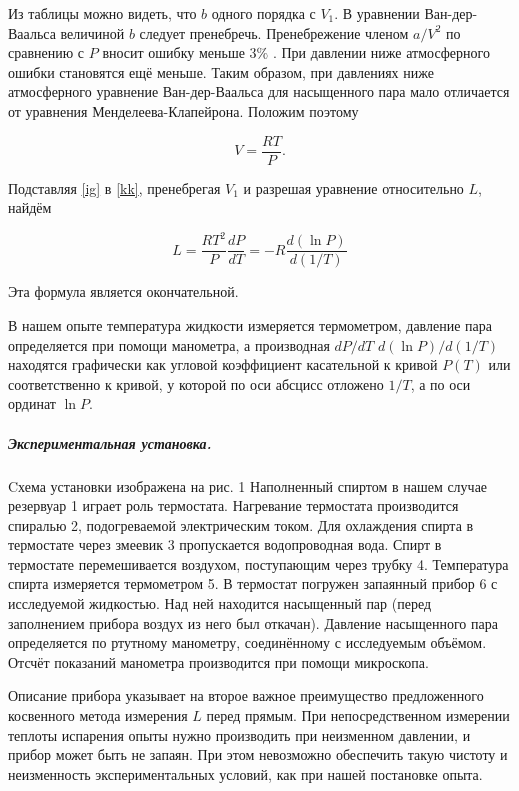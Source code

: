 \documentclass[a4paper, 12pt]{article}
\begin{document}
\bigskip

Из таблицы можно видеть, что $b$ одного порядка с $V_1$. В уравнении Ван-дер-Ваальса величиной $b$ следует пренебречь. Пренебрежение членом $a/V^2$  по сравнению с $P$ вносит ошибку меньше $3\%$ . При давлении ниже атмосферного ошибки становятся ещё меньше. Таким образом, при давлениях ниже атмосферного уравнение Ван-дер-Ваальса для насыщенного пара мало отличается от уравнения Менделеева-Клапейрона. Положим поэтому

\bigskip

\begin{equation} \label{ig}
	V = \frac{RT}{P}.
\end{equation}

\bigskip

Подставляя \eqref{ig} в \eqref{kk}, пренебрегая $V_1$ и разрешая уравнение относительно $L$, найдём 

\bigskip

\begin{equation} \label{res}
	L = \frac{RT^2}{P}\frac{dP}{dT}=-R\frac{d(\ln P)}{d(1/T)}
\end{equation}

\bigskip

Эта формула является окончательной. 

В нашем опыте температура жидкости измеряется термометром, давление пара определяется  при помощи манометра, а производная $dP / dT$ $d(\ln P) / d(1 / T) $ находятся графически как угловой коэффициент касательной к кривой $P(T)$ или соответственно к кривой, у которой по оси абсцисс отложено $1/T$, а по оси ординат $\ln P$. 

\subparagraph*{Экспериментальная установка.} Cхема установки изображена на рис. 1 Наполненный спиртом в нашем случае резервуар 1 играет роль термостата. Нагревание термостата производится спиралью 2, подогреваемой электрическим током. Для охлаждения спирта в термостате через змеевик 3 пропускается водопроводная вода. Спирт в термостате перемешивается воздухом, поступающим через трубку 4. Температура спирта измеряется термометром 5. В термостат погружен запаянный прибор 6 с исследуемой жидкостью. Над ней находится насыщенный пар (перед заполнением прибора воздух из него был откачан). Давление насыщенного пара определяется по ртутному манометру, соединённому с исследуемым объёмом. Отсчёт показаний манометра производится при помощи микроскопа. 

Описание прибора указывает на второе важное преимущество предложенного косвенного метода измерения $L$ перед прямым. При непосредственном измерении теплоты испарения опыты нужно производить при неизменном давлении, и прибор может быть не запаян. При этом невозможно обеспечить такую чистоту и неизменность экспериментальных условий, как при нашей постановке опыта. 
\end{document}
